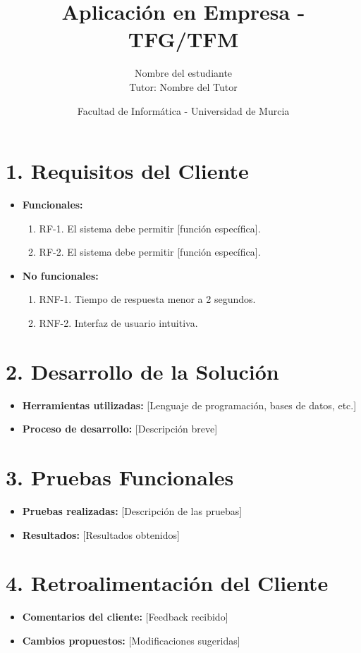 \documentclass[12pt, a4paper]{article}
\title{\textbf{Aplicación en Empresa - TFG/TFM}}
\author{Nombre del estudiante \\ Tutor: Nombre del Tutor}
\date{Facultad de Informática - Universidad de Murcia}
\begin{document}
\maketitle

\section*{1. Requisitos del Cliente}
\begin{itemize}
    \item \textbf{Funcionales:}
    \begin{enumerate}
        \item RF-1. El sistema debe permitir [función específica].
        \item RF-2. El sistema debe permitir [función específica].
    \end{enumerate}

    \item \textbf{No funcionales:}
    \begin{enumerate}
        \item RNF-1. Tiempo de respuesta menor a 2 segundos.
        \item RNF-2. Interfaz de usuario intuitiva.
    \end{enumerate}
\end{itemize}

\section*{2. Desarrollo de la Solución}
\begin{itemize}
    \item \textbf{Herramientas utilizadas:} [Lenguaje de programación, bases de datos, etc.]
    \item \textbf{Proceso de desarrollo:} [Descripción breve]
\end{itemize}

\section*{3. Pruebas Funcionales}
\begin{itemize}
    \item \textbf{Pruebas realizadas:} [Descripción de las pruebas]
    \item \textbf{Resultados:} [Resultados obtenidos]
\end{itemize}

\section*{4. Retroalimentación del Cliente}
\begin{itemize}
    \item \textbf{Comentarios del cliente:} [Feedback recibido]
    \item \textbf{Cambios propuestos:} [Modificaciones sugeridas]
\end{itemize}
\end{document}

